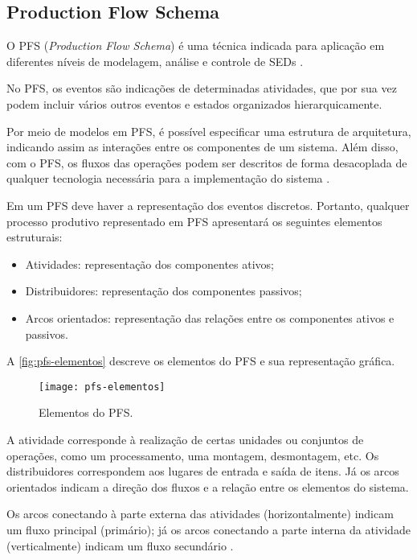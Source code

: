 	\subsection{Production Flow Schema}
	
	O PFS (\textit{Production Flow Schema}) é uma técnica indicada para aplicação em diferentes níveis de modelagem, análise e controle de SEDs \cite{miyagi1996controle}.
	
	No PFS, os eventos são indicações de determinadas atividades, que por sua vez podem incluir vários outros eventos e estados organizados hierarquicamente.
	
	Por meio de modelos em PFS, é possível especificar uma estrutura de arquitetura, indicando assim as interações entre os componentes de um sistema. Além disso, com o PFS, os fluxos das operações podem ser descritos de forma desacoplada de qualquer tecnologia necessária para a implementação do sistema \cite{pisching2018equipmentrami}.
	
	Em um PFS deve haver a representação dos eventos discretos. Portanto, qualquer processo produtivo representado em PFS apresentará os seguintes elementos estruturais:
	
	\begin{itemize}
		\item Atividades: representação dos componentes ativos;
		\item Distribuidores: representação dos componentes passivos;
		\item Arcos orientados: representação das relações entre os componentes ativos  e passivos.
	\end{itemize}

	A \autoref{fig:pfs-elementos} descreve os elementos do PFS e sua representação gráfica.
	
	\begin{figure}[htb]
		\centering
		\label{fig:pfs-elementos}
		\texttt{[image: pfs-elementos]}
		\caption{Elementos do PFS.}
	\end{figure}

	A atividade corresponde à realização de certas unidades ou conjuntos de operações, como um processamento, uma montagem, desmontagem, etc. Os distribuidores correspondem aos lugares de entrada e saída de itens. Já os arcos orientados indicam a direção dos fluxos e a relação entre os elementos do sistema.
	
	Os arcos conectando à parte externa das atividades (horizontalmente) indicam um fluxo principal (primário); já os arcos conectando a parte interna da atividade (verticalmente) indicam um fluxo secundário \cite{miyagi1996controle}. 
	
